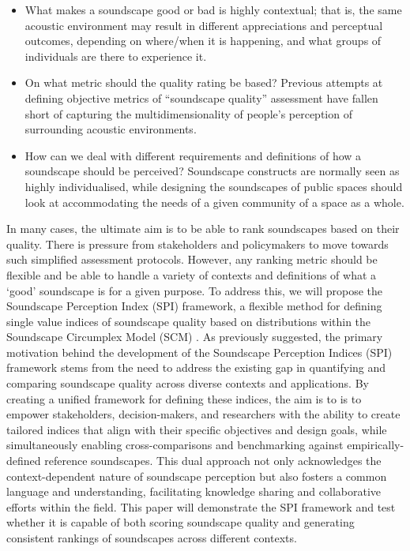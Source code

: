 \documentclass[
  authoryear,
  preprint,
  3p]{elsarticle}
\providecommand{\tightlist}{%
  \setlength{\itemsep}{0pt}\setlength{\parskip}{0pt}}\usepackage{longtable,booktabs,array}
\begin{document}
\begin{itemize}
\tightlist
\item
  What makes a soundscape good or bad is highly contextual; that is, the
  same acoustic environment may result in different appreciations and
  perceptual outcomes, depending on where/when it is happening, and what
  groups of individuals are there to experience it.
\item
  On what metric should the quality rating be based? Previous attempts
  at defining objective metrics of ``soundscape quality'' assessment
  have fallen short of capturing the multidimensionality of people's
  perception of surrounding acoustic environments.
\item
  How can we deal with different requirements and definitions of how a
  soundscape should be perceived? Soundscape constructs are normally
  seen as highly individualised, while designing the soundscapes of
  public spaces should look at accommodating the needs of a given
  community of a space as a whole.
\end{itemize}

In many cases, the ultimate aim is to be able to rank soundscapes based
on their quality. There is pressure from stakeholders and policymakers
to move towards such simplified assessment protocols. However, any
ranking metric should be flexible and be able to handle a variety of
contexts and definitions of what a `good' soundscape is for a given
purpose. To address this, we will propose the Soundscape Perception
Index (SPI) framework, a flexible method for defining single value
indices of soundscape quality based on distributions within the
Soundscape Circumplex Model (SCM) \citep[\citet{Axelsson2012Swedish},
\citet{Mitchell2022How}]{Axelsson2010principal}. As previously
suggested, the primary motivation behind the development of the
Soundscape Perception Indices (SPI) framework stems from the need to
address the existing gap in quantifying and comparing soundscape quality
across diverse contexts and applications. By creating a unified
framework for defining these indices, the aim is to is to empower
stakeholders, decision-makers, and researchers with the ability to
create tailored indices that align with their specific objectives and
design goals, while simultaneously enabling cross-comparisons and
benchmarking against empirically-defined reference soundscapes. This
dual approach not only acknowledges the context-dependent nature of
soundscape perception but also fosters a common language and
understanding, facilitating knowledge sharing and collaborative efforts
within the field. This paper will demonstrate the SPI framework and test
whether it is capable of both scoring soundscape quality and generating
consistent rankings of soundscapes across different contexts.
\end{document}
